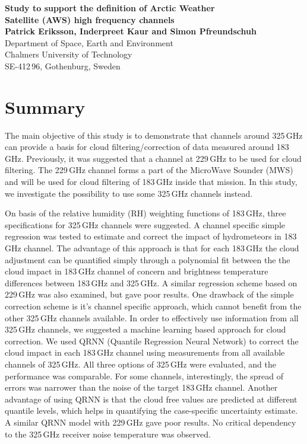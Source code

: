 \documentclass[12pt]{article}
\begin{document}


\noindent
\textbf{\Large Study to support the definition of Arctic Weather \vspace{1mm}\\
Satellite (AWS) high frequency channels} \vspace{8mm}\\
{\bf Patrick Eriksson, Inderpreet Kaur and Simon Pfreundschuh}\\
Department of Space, Earth and Environment\\
Chalmers University of Technology\\
SE-412\,96, Gothenburg, Sweden\vspace{10mm}

\section*{Summary}
%
The main objective of this study is to demonstrate that channels around
325\,GHz can provide a basis for cloud filtering/correction of data measured
around 183\,GHz. Previously, it was suggested that a channel at 229\,GHz to be
used for cloud filtering. The 229\,GHz channel forms a part of the MicroWave
Sounder (MWS) and will be used for cloud filtering of 183\,GHz inside that
mission. In this study, we investigate the possibility to use some 325\,GHz
channels instead.

On basis of the relative humidity (RH) weighting functions of 183\,GHz, three
 specifications for 325\,GHz channels were suggested. A channel specific simple regression was tested to estimate and correct the impact of hydrometeors in 183\,GHz channel.
The advantage of this approach is that for each 183\,GHz the cloud adjustment
can be quantified simply through a polynomial fit between the the cloud impact
in 183\,GHz channel of concern and brightness temperature differences between
183\,GHz and 325\,GHz. A similar regression scheme based on 229\,GHz was also
examined, but gave poor results. One drawback of the simple correction scheme
is it's channel specific approach, which cannot benefit from the other 325\,GHz
channels available. In order to effectively use information from all 325\,GHz
channels, we suggested a machine learning based approach for cloud correction.
We used QRNN (Quantile Regression Neural Network) to correct the cloud
impact in each 183\,GHz channel using measurements from all available channels
of 325\,GHz. All three options of 325\,GHz were evaluated, and the performance
was comparable. For some channels, interestingly, the spread of errors was
narrower than the noise of the target 183\,GHz channel. Another advantage of
using QRNN is that the cloud free values are predicted at different quantile
levels, which helps in quantifying the case-specific uncertainty estimate. A
similar QRNN model with 229\,GHz gave poor results. No critical dependency to
the 325\,GHz receiver noise temperature was observed.
\end{document}
